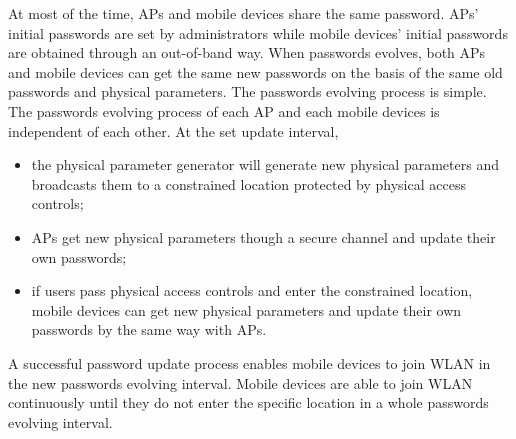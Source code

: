 At most of the time, APs and mobile devices share the same password. APs’ initial passwords are set by administrators while mobile devices’ initial passwords are obtained through an out-of-band way. When passwords evolves, both APs and mobile devices can get the same new passwords on the basis of the same old passwords and physical parameters. The passwords evolving process is simple. The passwords evolving process of each AP and each mobile devices is independent of each other. At the set update interval, 
\begin{itemize}
	\item the physical parameter generator will generate new physical parameters and broadcasts them to a constrained location protected by physical access controls; 
	\item APs get new physical parameters though a secure channel and update their own passwords; 
	\item if users pass physical access controls and enter the constrained location, mobile devices can get new physical parameters and update their own passwords by the same way with APs. 
\end{itemize}
A successful password update process enables mobile devices to join WLAN in the new passwords evolving interval. Mobile devices are able to join WLAN continuously until they do not enter the specific location in a whole passwords evolving interval. 
